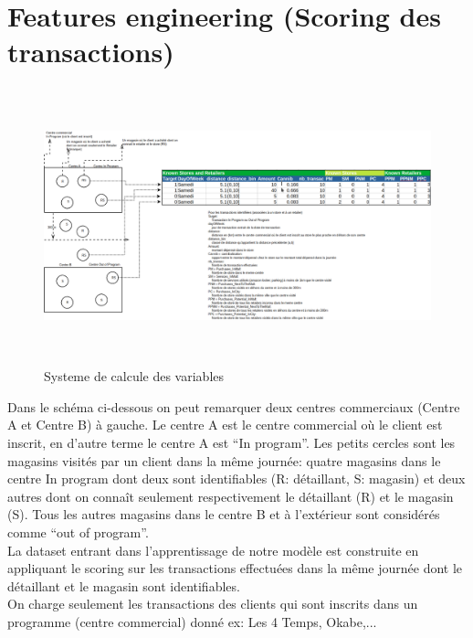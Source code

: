 \section{Features engineering (Scoring des transactions)}
\begin{figure}[h]
\begin{center}
\includegraphics[width=15cm,height=8cm]{images/feature_engineering.png}
\caption[Systeme de calcule des variables]{Systeme de calcule des variables}
\label{monlabel}
\end{center}
\end{figure}


Dans le schéma ci-dessous on peut remarquer deux centres commerciaux (Centre A et Centre B) à gauche. Le centre A est le centre commercial où le client est inscrit, en d’autre terme le centre A est “In program”. Les petits cercles sont les magasins visités par un client dans la même journée: quatre magasins dans le centre In program dont deux sont identifiables (R: détaillant, S: magasin) et deux autres dont on connaît seulement respectivement le détaillant (R) et le magasin (S). Tous les autres magasins dans le centre B et à l’extérieur sont considérés comme “out of program”.\\

La dataset entrant dans l’apprentissage de notre modèle est construite en appliquant le scoring sur les transactions effectuées dans la même journée dont le détaillant et le magasin sont identifiables. \\

On charge seulement les transactions des clients qui sont inscrits dans
un programme (centre commercial) donné ex: Les 4 Temps, Okabe,...



